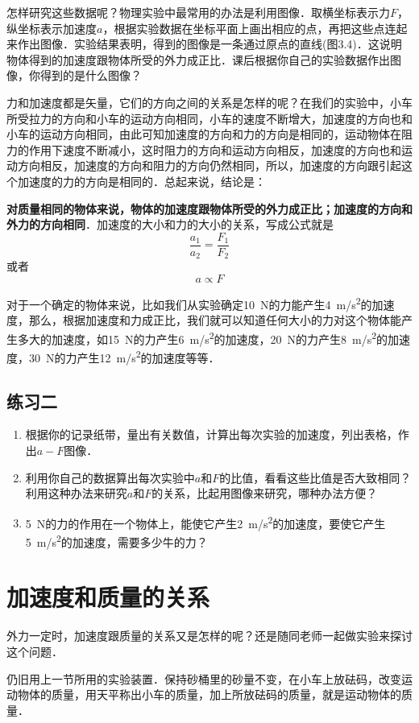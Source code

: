 怎样研究这些数据呢？物理实验中最常用的办法是利用图像．取横坐标表示力$F$，纵坐标表示加速度$a$，根据实验数据在坐标平面上画出相应的点，再把这些点连起来作出图像．实验结果表明，得到的图像是一条通过原点的直线(图3.4)．这说明物体得到的加速度跟物体所受的外力成正比．课后根据你自己的实验数据作出图像，你得到的是什么图像？

力和加速度都是矢量，它们的方向之间的关系是怎样的呢？在我们的实验中，小车所受拉力的方向和小车的运动方向相同，小车的速度不断增大，加速度的方向也和小车的运动方向相同，由此可知加速度的方向和力的方向是相同的，运动物体在阻力的作用下速度不断减小，这时阻力的方向和运动方向相反，加速度的方向也和运动方向相反，加速度的方向和阻力的方向仍然相同，所以，加速度的方向跟引起这个加速度的力的方向是相同的．总起来说，结论是：

\textbf{ 对质量相同的物体来说，物体的加速度跟物体所受的外力成正比；加速度的方向和外力的方向相同}．加速度的大小和力的大小的关系，写成公式就是
\[\frac{a_1}{a_2}=\frac{F_1}{F_2} \]
或者
\[a\propto F\]

对于一个确定的物体来说，比如我们从实验确定\SI{10}{N}的力能产生\SI{4}{m/s^2}的加速度，那么，根据加速度和力成正比，我们就可以知道任何大小的力对这个物体能产生多大的加速度，如\SI{15}{N}的力产生\SI{6}{m/s^2}的加速度，\SI{20}{N}的力产生\SI{8}{m/s^2}的加速度，\SI{30}{N}的力产生\SI{12}{m/s^2}的加速度等等．

\subsection*{练习二}
\begin{enumerate}
    \item 根据你的记录纸带，量出有关数值，计算出每次实验的加速度，列出表格，作出$a-F$图像．
    \item 利用你自己的数据算出每次实验中$a$和$F$的比值，看看这些比值是否大致相同？利用这种办法来研究$a$和$F$的关系，比起用图像来研究，哪种办法方便？
    \item \SI{5}{N}的力的作用在一个物体上，能使它产生\SI{2}{m/s^2}的加速度，要使它产生\SI{5}{m/s^2}的加速度，需要多少牛的力？
\end{enumerate}
\newpage
\section{加速度和质量的关系}
外力一定时，加速度跟质量的关系又是怎样的呢？还是随同老师一起做实验来探讨这个问题．

仍旧用上一节所用的实验装置．保持砂桶里的砂量不变，在小车上放砝码，改变运动物体的质量，用天平称出小车的质量，加上所放砝码的质量，就是运动物体的质量．


